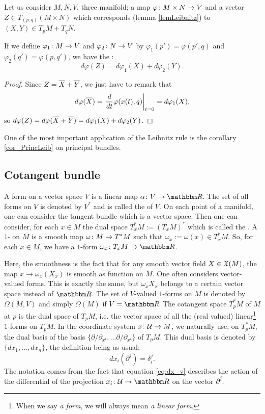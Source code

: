 \begin{proposition} \label{Leibnitz}
Let us consider $M,N,V$, three manifold; a map $\varphi\colon M\times N\to V$ and a vector $Z\in T_{(p,q)}(M\times N)$ which corresponds (lemma \ref{lemLeibnitz}) to $(X,Y)\in T_pM+T_qN$.

If we define $\varphi_1\colon M\to V$ and  $\varphi_2\colon N\to V$ by $\varphi_1(p')=\varphi(p',q)$ and $\varphi_2(q')=\varphi(p,q')$, we have the :
\begin{equation}
    d\varphi(Z)=d\varphi_1(X)+d\varphi_2(Y).
\end{equation}
\end{proposition}
\begin{proof}
 Since $Z=\overline{X}+\overline{Y}$, we just have to remark that
\[
                  d\varphi(\overline{X})=\left.\frac{d}{dt}\varphi(x(t),q)\right|_{t=0}=d\varphi_1(X),
\]
so $d\varphi(Z)=d\varphi(\overline{X}+\overline{Y})=d\varphi_1(X)+d\varphi_2(Y)$.
\end{proof}
One of the most important application of the Leibnitz rule is the corollary \ref{cor_PrincLeib} on principal bundles. 

\subsection{Cotangent bundle}

A form on a vector space $V$ is a linear map $\dpt{\alpha}{V}{\eR}$. The set of all forms on $V$ is denoted by $V^*$ and is called the  of $V$. On each point of a manifold, one can consider the tangent bundle which is a vector space. Then one can consider, for each $x\in M$ the dual space $T^*_xM:=(T_xM)^*$ which is called the . A $1$- on $M$ is a smooth map $\omega\colon M\to T^*M$ such that $\omega_x:=\omega(x)\in T^*_xM$. So, for each $x\in M$, we have a $1$-form $\dpt{\omega_x}{T_xM}{\eR}$.

Here, the smoothness is the fact that for any smooth vector field $X\in\mathfrak{X}(M)$, the map $x\to\omega_x(X_x)$ is smooth as function on $M$. One often considers vector-valued forms. This is exactly the same, but $\omega_xX_x$ belongs to a certain vector space instead of $\eR$. The set of $V$-valued $1$-forms on $M$ is denoted by $\Omega(M,V)$  and simply $\Omega(M)$ if $V=\eR$
The cotangent space $T^*_pM$ of $M$ at $p$ is the dual space of $T_pM$, i.e. the vector space of all the (real valued) linear\footnote{When we say \emph{a form}, we will always mean \emph{a linear form}.} $1$-forms on $T_pM$. In the coordinate system $x\colon \mathcal{U}\to M$, we naturally use, on $T^*_pM$, the dual basis of the basis $\{\partial/\partial_{x^i},\ldots\partial/\partial_{x^i}\}$ of $T_pM$. This dual basis is denoted by $\{dx_1,\ldots,dx_n\}$, the definition being as usual:
\begin{equation}\label{eq:dx_v}
  dx_i(\partial^j)=\delta^j_i.
\end{equation}
The notation comes from the fact that equation \eqref{eq:dx_v} describes the action of the differential of the projection $\dpt{x_i}{\mU}{\eR}$ on the vector $\partial^j$.

